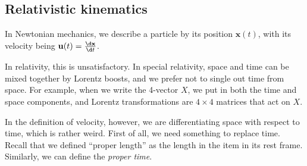 \documentclass[a4paper]{article}
\begin{document}
\subsection{Relativistic kinematics}
In Newtonian mechanics, we describe a particle by its position $\mathbf{x}(t)$, with its velocity being $\mathbf{u}(t) = \frac{\d \mathbf{x}}{\d t}$.

In relativity, this is unsatisfactory. In special relativity, space and time can be mixed together by Lorentz boosts, and we prefer not to single out time from space. For example, when we write the 4-vector $X$, we put in both the time and space components, and Lorentz transformations are $4\times 4$ matrices that act on $X$.

In the definition of velocity, however, we are differentiating space with respect to time, which is rather weird. First of all, we need something to replace time. Recall that we defined ``proper length'' as the length in the item in its rest frame. Similarly, we can define the \emph{proper time}.
\end{document}
